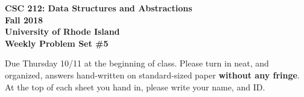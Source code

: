 \documentclass[11pt]{article}
\begin{document}
    \thispagestyle{empty}
    
    \begin{center}
        {\Large\bf CSC 212: Data Structures and Abstractions}\\
        \medskip
        {\Large\bf Fall 2018}\\
        \medskip
        {\Large\bf University of Rhode Island}\\
        \bigskip
        {\Large\bf Weekly Problem Set \#5}
    \end{center}
    
    Due Thursday 10/11 at the beginning of class. Please turn in neat, and organized, answers hand-written on standard-sized paper \textbf{without any fringe}. At the top of each sheet you hand in, please write your name, and ID.
    
\end{document}
